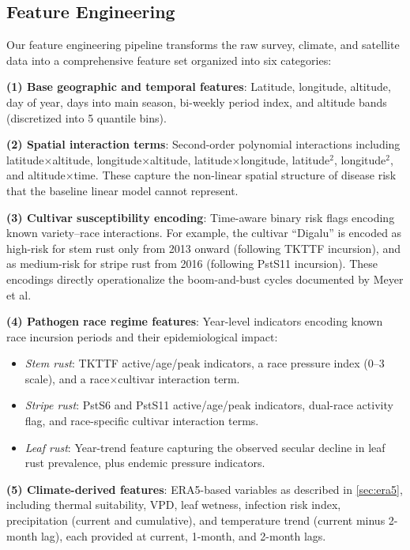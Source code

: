 \documentclass[10pt,twocolumn,letterpaper]{article}
\begin{document}
\subsection{Feature Engineering}

Our feature engineering pipeline transforms the raw survey, climate, and satellite data into a comprehensive feature set organized into six categories:

\noindent\textbf{(1) Base geographic and temporal features}: Latitude, longitude, altitude, day of year, days into main season, bi-weekly period index, and altitude bands (discretized into 5 quantile bins).

\noindent\textbf{(2) Spatial interaction terms}: Second-order polynomial interactions including latitude$\times$altitude, longitude$\times$altitude, latitude$\times$longitude, latitude$^2$, longitude$^2$, and altitude$\times$time. These capture the non-linear spatial structure of disease risk that the baseline linear model cannot represent.

\noindent\textbf{(3) Cultivar susceptibility encoding}: Time-aware binary risk flags encoding known variety--race interactions. For example, the cultivar ``Digalu'' is encoded as high-risk for stem rust only from 2013 onward (following TKTTF incursion), and as medium-risk for stripe rust from 2016 (following PstS11 incursion). These encodings directly operationalize the boom-and-bust cycles documented by Meyer et al.

\noindent\textbf{(4) Pathogen race regime features}: Year-level indicators encoding known race incursion periods and their epidemiological impact:
\begin{itemize}
\item \textit{Stem rust}: TKTTF active/age/peak indicators, a race pressure index (0--3 scale), and a race$\times$cultivar interaction term.
\item \textit{Stripe rust}: PstS6 and PstS11 active/age/peak indicators, dual-race activity flag, and race-specific cultivar interaction terms.
\item \textit{Leaf rust}: Year-trend feature capturing the observed secular decline in leaf rust prevalence, plus endemic pressure indicators.
\end{itemize}

\noindent\textbf{(5) Climate-derived features}: ERA5-based variables as described in \cref{sec:era5}, including thermal suitability, VPD, leaf wetness, infection risk index, precipitation (current and cumulative), and temperature trend (current minus 2-month lag), each provided at current, 1-month, and 2-month lags.
\end{document}
